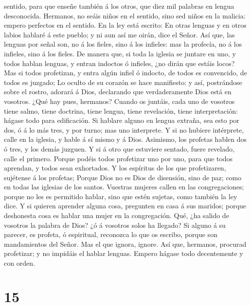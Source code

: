 sentido, para que enseñe también á los otros, que diez mil palabras en
lengua desconocida.  Hermanos, no seáis niños en el
sentido, sino sed niños en la malicia: empero perfectos en el sentido.
 En la ley está escrito: En otras lenguas y en otros labios
hablaré á este pueblo; y ni aun así me oirán, dice el Señor.
 Así que, las lenguas por señal son, no á los fieles, sino
á los infieles: mas la profecía, no á los infieles, sino á los fieles.
 De manera que, si toda la iglesia se juntare en uno, y
todos hablan lenguas, y entran indoctos ó infieles, ¿no dirán que estáis
locos?  Mas si todos profetizan, y entra algún infiel ó
indocto, de todos es convencido, de todos es juzgado;  Lo
oculto de su corazón se hace manifiesto: y así, postrándose sobre el
rostro, adorará á Dios, declarando que verdaderamente Dios está en
vosotros.  ¿Qué hay pues, hermanos? Cuando os juntáis, cada
uno de vosotros tiene salmo, tiene doctrina, tiene lengua, tiene
revelación, tiene interpretación: hágase todo para edificación.
 Si hablare alguno en lengua extraña, sea esto por dos, ó á
lo más tres, y por turno; mas uno interprete.  Y si no
hubiere intérprete, calle en la iglesia, y hable á sí mismo y á Dios.
 Asimismo, los profetas hablen dos ó tres, y los demás
juzguen.  Y si á otro que estuviere sentado, fuere
revelado, calle el primero.  Porque podéis todos profetizar
uno por uno, para que todos aprendan, y todos sean exhortados.
 Y los espíritus de los que profetizaren, sujétense á los
profetas;  Porque Dios no es Dios de disensión, sino de
paz; como en todas las iglesias de los santos.  Vuestras
mujeres callen en las congregaciones; porque no les es permitido hablar,
sino que estén sujetas, como también la ley dice.  Y si
quieren aprender alguna cosa, pregunten en casa á sus maridos; porque
deshonesta cosa es hablar una mujer en la congregación. 
Qué, ¿ha salido de vosotros la palabra de Dios? ¿ó á vosotros solos ha
llegado?  Si alguno á su parecer, es profeta, ó espiritual,
reconozca lo que os escribo, porque son mandamientos del Señor.
 Mas el que ignora, ignore.  Así que,
hermanos, procurad profetizar; y no impidáis el hablar lenguas.
 Empero hágase todo decentemente y con orden.

\hypertarget{section-14}{%
\section{15}\label{section-14}}


